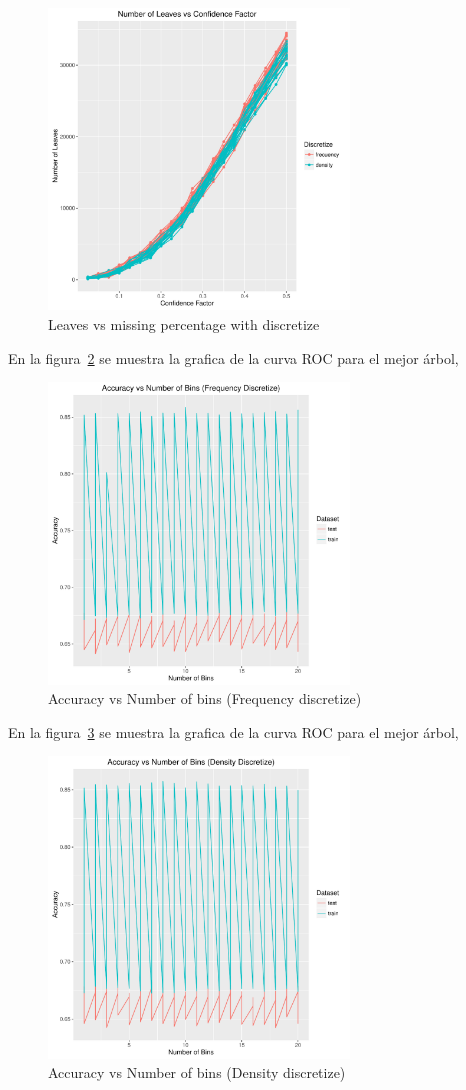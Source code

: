 \begin{figure}
  \centering
  \includegraphics[width = 8cm]{6d.pdf}
  \caption{Leaves vs missing percentage with discretize}
  \label{fig:6d}
\end{figure}

En la figura~\ref{fig:6e} se muestra la grafica de la curva ROC para el mejor árbol,

\begin{figure}
  \centering
  \includegraphics[width = 8cm]{6e.pdf}
  \caption{Accuracy vs Number of bins (Frequency discretize)}
  \label{fig:6e}
\end{figure}

En la figura~\ref{fig:6f} se muestra la grafica de la curva ROC para el mejor árbol,

\begin{figure}
  \centering
  \includegraphics[width = 8cm]{6f.pdf}
  \caption{Accuracy vs Number of bins (Density discretize)}
  \label{fig:6f}
\end{figure}




